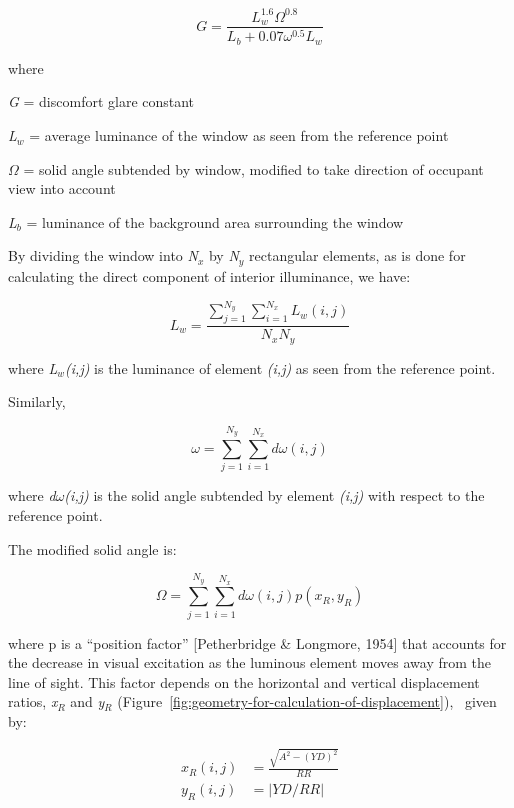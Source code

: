 \begin{equation}
G = \frac{{L_w^{1.6}{\Omega ^{0.8}}}}{{{L_b} + 0.07{\omega ^{0.5}}{L_w}}}
\end{equation}

where

\emph{G} = discomfort glare constant

\emph{L\(_{w}\)} = average luminance of the window as seen from the reference point

\(\Omega\) = solid angle subtended by window, modified to take direction of occupant view into account

\emph{L\(_{b}\)} = luminance of the background area surrounding the window

By dividing the window into \emph{N\(_{x}\)} by \emph{N\(_{y}\)} rectangular elements, as is done for calculating the direct component of interior illuminance, we have:

\begin{equation}
{L_w} = \frac{{\sum\limits_{j = 1}^{{N_y}} {\sum\limits_{i = 1}^{{N_x}} {{L_w}(i,j)} } }}{{{N_x}{N_y}}}
\end{equation}

where \emph{L\(_{w}\)(i,j)} is the luminance of element \emph{(i,j)} as seen from the reference point.

Similarly,

\begin{equation}
\omega  = \sum\limits_{j = 1}^{{N_y}} {\sum\limits_{i = 1}^{{N_x}} {d\omega (i,j)} }
\end{equation}

where \emph{d$\omega$(i,j)} is the solid angle subtended by element \emph{(i,j)} with respect to the reference point.

The modified solid angle is:

\begin{equation}
\Omega = \sum\limits_{j = 1}^{{N_y}} {\sum\limits_{i = 1}^{{N_x}} {d\omega (i,j)} } p({x_R},{y_R})
\end{equation}

where p is a ``position factor'' {[}Petherbridge \& Longmore, 1954{]} that accounts for the decrease in visual excitation as the luminous element moves away from the line of sight. This factor depends on the horizontal and vertical displacement ratios, \emph{x\(_{R}\)} and \emph{y\(_{R}\)} (Figure~\ref{fig:geometry-for-calculation-of-displacement}),~ given by:

\begin{equation}
\begin{array}{rl}
    x_R(i,j) & = \frac{\sqrt{A^2-(YD)^2}}{RR} \\
    y_R(i,j) & = \left|YD/RR\right|
\end{array}
\end{equation}

